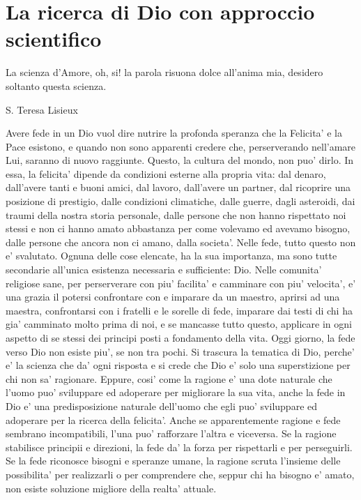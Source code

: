 \chapter{La ricerca di Dio con approccio scientifico}
\label{chapterDio}

\epigraph{
     La scienza d'Amore, oh, si! la parola risuona dolce all'anima mia, desidero soltanto questa scienza.
 }{S. Teresa Lisieux}

Avere fede in un Dio vuol dire nutrire la profonda speranza che la Felicita' e la Pace esistono, e quando non sono apparenti credere che, perserverando nell'amare Lui, saranno di nuovo raggiunte. Questo, la cultura del mondo, non puo' dirlo. In essa, la felicita' dipende da condizioni esterne alla propria vita: dal denaro, dall'avere tanti e buoni amici, dal lavoro, dall'avere un partner, dal ricoprire una posizione di prestigio, dalle condizioni climatiche, dalle guerre, dagli asteroidi, dai traumi della nostra storia personale, dalle persone che non hanno rispettato noi stessi e non ci hanno amato abbastanza per come volevamo ed avevamo bisogno, dalle persone che ancora non ci amano, dalla societa'. Nelle fede, tutto questo non e' svalutato. Ognuna delle cose elencate, ha la sua importanza, ma sono tutte secondarie all'unica esistenza necessaria e sufficiente: Dio.
Nelle comunita' religiose sane, per perserverare con piu' facilita' e camminare con piu' velocita', e' una grazia il potersi confrontare con e imparare da un maestro, aprirsi ad una maestra, confrontarsi con i fratelli e le sorelle di fede, imparare dai testi di chi ha gia' camminato molto prima di noi, e se mancasse tutto questo, applicare in ogni aspetto di se stessi dei principi posti a fondamento della vita.
Oggi giorno, la fede verso Dio non esiste piu', se non tra pochi. Si trascura la tematica di Dio, perche' e' la scienza che da' ogni risposta e si crede che Dio e' solo una superstizione per chi non sa' ragionare. Eppure, cosi' come la ragione e' una dote naturale che l'uomo puo' sviluppare ed adoperare per migliorare la sua vita, anche la fede in Dio e' una predisposizione naturale dell'uomo che egli puo' sviluppare ed adoperare per la ricerca della felicita'. Anche se apparentemente ragione e fede sembrano incompatibili, l'una puo' rafforzare l'altra e viceversa. Se la ragione stabilisce principii e direzioni, la fede da' la forza per rispettarli e per perseguirli. Se la fede riconosce bisogni e speranze umane, la ragione scruta l'insieme delle possibilita' per realizzarli o per comprendere che, seppur chi ha bisogno e' amato, non esiste soluzione migliore della realta' attuale.

